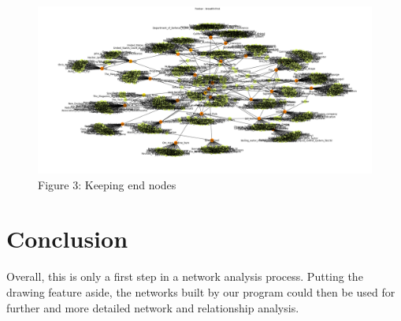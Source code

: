 \documentclass[10pt]{article}
\begin{document}
	\begin{figure}[htb]	
			\includegraphics[width=\textwidth]{figure3.png}
   			  	\centering
  			  	\caption{Figure 3: Keeping end nodes}
		\end{figure}

	
	
\section{Conclusion}

Overall, this is only a first step in a network analysis process. Putting the drawing feature aside, the networks built by our program could then be used for further and more detailed network and relationship analysis.



\newpage
 

\end{document}
